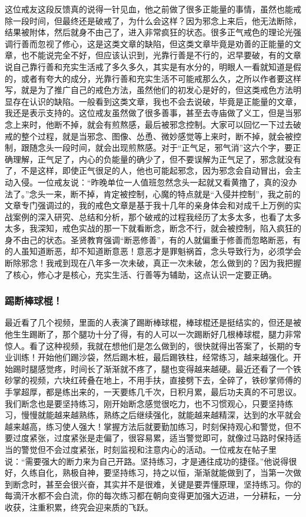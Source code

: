 这位戒友这段反馈真的说得一针见血，他之前做了很多正能量的事情，虽然也能戒除一段时间，但最终还是破戒了，为什么会这样？因为邪念上来后，他无法断除，结果被附体，然后就身不由己了，进入非常疯狂的状态。很多正气戒色的理论光强调行善而忽视了修心，这是这类文章的缺陷，但这类文章毕竟是劝善的正能量的文章，也不能说完全不好，但应该认识到，光靠行善是不行的，迟早要破，有的文章说自己靠行善和充实生活戒了多久多久，其实是有水分的，明眼人一看就知道是假的，或者有夸大的成分，光靠行善和充实生活不可能戒那么久，之所以作者要这样写，就是为了推广自己的戒色方法，虽然他们的初发心是好的，但这类戒色方法明显存在认识的缺陷。一般看到这类文章，我也不会去说破，毕竟是正能量的文章，我还是表示支持的。这位戒友虽然做了很多善事，甚至去寺庙做了义工，但是当邪念上来时，他断不掉，就会有煎熬感，最后被邪念控制。大家可以回忆一下过去破戒的整个过程，就是当邪念、图像、怂恿、微妙感觉等上来时，断不掉，就会被控制，跟随念头一段时间，就会出现煎熬感。对于“正气足，邪气消”这六个字，要正确理解，正气足了，内心的负能量的确少了，但不要误解为正气足了，邪念就没有了，不是这样，即使正气很足的人，他也可能起邪念，因为邪念会自动冒出，会主动入侵。一位戒友说：“昨晚单位一人值班忽然念头一起就又看黄撸了，真的没办法了。”念头一来，断不掉，肯定被控制，心魔的特点就是“入侵并控制”，我之前的文章专门强调过的，我的戒色文章是基于我十几年的亲身体会和对成千上万例的实战案例的深入研究、总结和分析，那个破戒的过程我经历了太多太多，也看了太多太多，我深知，戒色实战的那一下就看断念，断念不行，就会被控制，陷入疯狂的身不由己的状态。圣贤教育强调“断恶修善”，有的人就偏重于修善而忽略断恶，有的人虽知道断恶，却不知道断意恶！意恶才是罪魁祸首，念头导致行为，必须学会断除邪念！我戒到现在八年多一次未破，真正一次未破，怎么做到的？因为我把握了核心，修心才是核心，充实生活、行善等为辅助，这点认识一定要正确。

\subsubsection{踢断棒球棍！}

最近看了几个视频，里面的人表演了踢断棒球棍，棒球棍还是挺结实的，但还是被他生生踢断了，那个腿功十分了得，有的人可以一次踢断好几根棒球棍，腿力非常惊人。看了这种视频，我就在想他们是怎么做到的，很快就得出答案了，长期的专业训练！开始他们踢沙袋，然后踢木桩，最后踢铁柱，经常练习，越来越强化。开始踢时腿感觉疼，时间长了渐渐就不疼了，腿也变得越来越硬。最近还看了一个铁砂掌的视频，六块红砖叠在地上，不用手扶，直接劈下去，全碎了，铁砂掌师傅的手掌超厚，都是练出来的，一天要练几千次，日积月累，最后功夫真的不可思议。我们断念也是要坚持练习，刚开始断念感觉很吃力，也不习惯观心，只要坚持练习，慢慢就能越来越熟练，熟练之后继续强化，就能越来越精深，达到的水平就会越来越高，练习使人强大！掌握方法后就要勤加练习，时刻保持观心和警觉，但不要过度紧张，过度紧张是走偏了，很容易累，适当警觉即可，就像过马路时保持适当的警觉但不会过度紧张，时刻监视和注意内心的活动。一位戒友在帖子里说：“需要强大的断力来为自己开路。坚持练习，才是通往成功的捷径。”他说得很好，久练自化，熟极自神，要坚持练习，持之以恒，渐渐就能做到了，当第一次做到断念时，甚至会很兴奋，其实并不是很难，关键是要弄懂原理，坚持练习。你的每滴汗水都不会白流，你的每次练习都在朝向变得更加强大迈进，一分耕耘，一分收获，注重积累，终究会迎来质的飞跃。

